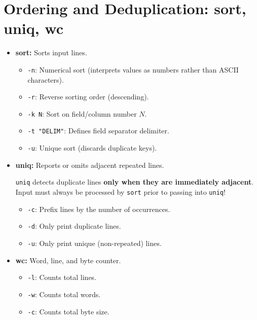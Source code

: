 \section{Ordering and Deduplication: sort, uniq, wc}
\begin{itemize}[leftmargin=1.5em]
    \item \textbf{sort:} Sorts input lines.
    \begin{itemize}
        \item \texttt{-n}: Numerical sort (interprets values as numbers rather than ASCII characters).
        \item \texttt{-r}: Reverse sorting order (descending).
        \item \texttt{-k N}: Sort on field/column number $N$.
        \item \texttt{-t "DELIM"}: Defines field separator delimiter.
        \item \texttt{-u}: Unique sort (discards duplicate keys).
    \end{itemize}
    \item \textbf{uniq:} Reports or omits adjacent repeated lines.
    \begin{warningbox}
    \texttt{uniq} detects duplicate lines \textbf{only when they are immediately adjacent}. Input must always be processed by \texttt{sort} prior to passing into \texttt{uniq}!
    \end{warningbox}
    \begin{itemize}
        \item \texttt{-c}: Prefix lines by the number of occurrences.
        \item \texttt{-d}: Only print duplicate lines.
        \item \texttt{-u}: Only print unique (non-repeated) lines.
    \end{itemize}
    \item \textbf{wc:} Word, line, and byte counter.
    \begin{itemize}
        \item \texttt{-l}: Counts total lines.
        \item \texttt{-w}: Counts total words.
        \item \texttt{-c}: Counts total byte size.
    \end{itemize}
\end{itemize}

